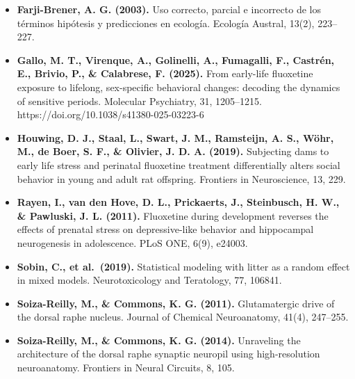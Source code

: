 \documentclass[
  letterpaper,
  DIV=11,
  numbers=noendperiod]{scrartcl}
\begin{document}
\begin{itemize}
\item
  \textbf{Farji-Brener, A. G. (2003).} Uso correcto, parcial e
  incorrecto de los términos hipótesis y predicciones en ecología.
  Ecología Austral, 13(2), 223--227.
\item
  \textbf{Gallo, M. T., Virenque, A., Golinelli, A., Fumagalli, F.,
  Castrén, E., Brivio, P., \& Calabrese, F. (2025).} From early-life
  fluoxetine exposure to lifelong, sex-specific behavioral changes:
  decoding the dynamics of sensitive periods. Molecular Psychiatry, 31,
  1205--1215. https://doi.org/10.1038/s41380-025-03223-6
\item
  \textbf{Houwing, D. J., Staal, L., Swart, J. M., Ramsteijn, A. S.,
  Wöhr, M., de Boer, S. F., \& Olivier, J. D. A. (2019).} Subjecting
  dams to early life stress and perinatal fluoxetine treatment
  differentially alters social behavior in young and adult rat
  offspring. Frontiers in Neuroscience, 13, 229.
\item
  \textbf{Rayen, I., van den Hove, D. L., Prickaerts, J., Steinbusch, H.
  W., \& Pawluski, J. L. (2011).} Fluoxetine during development reverses
  the effects of prenatal stress on depressive-like behavior and
  hippocampal neurogenesis in adolescence. PLoS ONE, 6(9), e24003.~
\item
  \textbf{Sobin, C., et al.~(2019).} Statistical modeling with litter as
  a random effect in mixed models. Neurotoxicology and Teratology, 77,
  106841.~
\item
  \textbf{Soiza-Reilly, M., \& Commons, K. G. (2011).} Glutamatergic
  drive of the dorsal raphe nucleus. Journal of Chemical Neuroanatomy,
  41(4), 247--255.
\item
  \textbf{Soiza-Reilly, M., \& Commons, K. G. (2014).} Unraveling the
  architecture of the dorsal raphe synaptic neuropil using
  high-resolution neuroanatomy. Frontiers in Neural Circuits, 8, 105.
\end{itemize}
\end{document}
